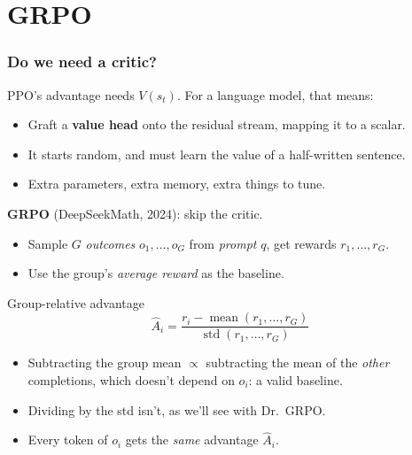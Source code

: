 \section{GRPO}

\begin{frame}
    \frametitle{Do we need a critic?}
    PPO's advantage needs $V(s_t)$. For a language model, that means:
    \begin{itemize}
        \item Graft a \textbf{value head} onto the residual stream, mapping it to a scalar.
        \item It starts random, and must learn the value of a half-written sentence.
        \item Extra parameters, extra memory, extra things to tune.
    \end{itemize}
    \pause
    \vspace{0.2cm}
    \textbf{GRPO} (DeepSeekMath, 2024): skip the critic.
    \begin{itemize}
        \item Sample $G$ \textit{outcomes} $o_1, \ldots, o_G$ from \textit{prompt} $q$,
        get rewards $r_1, \ldots, r_G$.
        \item Use the group's \textit{average reward} as the baseline.
    \end{itemize}
    \begin{block}{Group-relative advantage}
        $$
        \hat{A}_i = \frac{r_i - \operatorname{mean}(r_1, \ldots, r_G)}{\operatorname{std}(r_1, \ldots, r_G)}
        $$
    \end{block}
    \pause
    \begin{itemize}
        \item Subtracting the group mean $\propto$ subtracting the mean of the
        \textit{other} completions, which doesn't depend on $o_i$: a valid baseline.
        \item Dividing by the std isn't, as we'll see with Dr.\ GRPO.
        \item Every token of $o_i$ gets the \textit{same} advantage $\hat{A}_i$.
    \end{itemize}
\end{frame}

